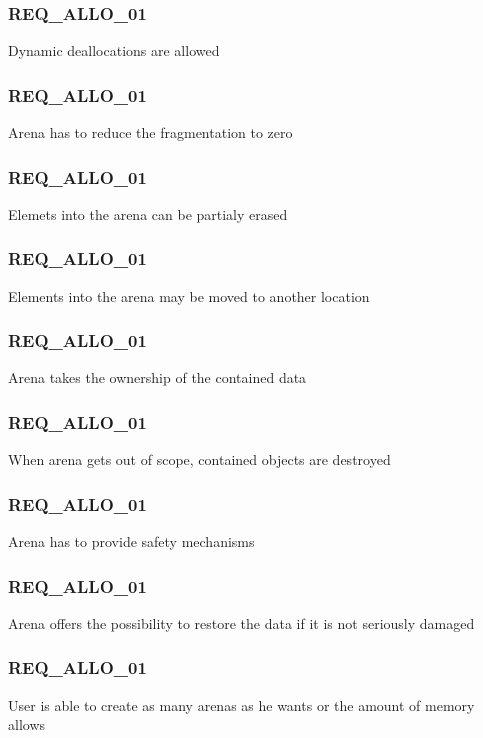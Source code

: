 \documentclass[a4paper,11pt]{article}
\begin{document}
\subsubsection{REQ\_ALLO\_01}
Dynamic deallocations are allowed

\subsubsection{REQ\_ALLO\_01}
Arena has to reduce the fragmentation to zero

\subsubsection{REQ\_ALLO\_01}
Elemets into the arena can be partialy erased

\subsubsection{REQ\_ALLO\_01}
Elements into the arena may be moved to another location

\subsubsection{REQ\_ALLO\_01}
Arena takes the ownership of the contained data

\subsubsection{REQ\_ALLO\_01}
When arena gets out of scope, contained objects are destroyed

\subsubsection{REQ\_ALLO\_01}
Arena has to provide safety mechanisms

\subsubsection{REQ\_ALLO\_01}
Arena offers the possibility to restore the data if it is not seriously damaged

\subsubsection{REQ\_ALLO\_01}
User is able to create as many arenas as he wants or the amount of memory allows
\end{document}
